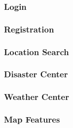 \subsubsection{Login}
\subsubsection{Registration}
\subsubsection{Location Search}
\subsubsection{Disaster Center}
\subsubsection{Weather Center}
\subsubsection{Map Features}